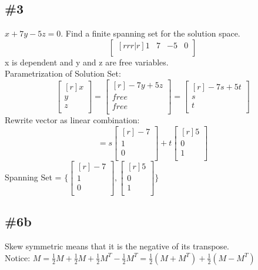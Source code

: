 \documentclass{report}
\theoremstyle{plain}
\theoremstyle{definition}
\theoremstyle{plain}
\begin{document}
\subsection{\#3}
$x+7y-5z=0$. Find a finite spanning set for the solution space.
\[ \begin{bmatrix}[rrr|r] 1&7&-5&0\\ \end{bmatrix} \]
x is dependent and y and z are free variables.\\
Parametrization of Solution Set:
\[ \begin{bmatrix}[r] x\\y\\z\\ \end{bmatrix} = \begin{bmatrix}[r] -7y+5z\\free\\free\\ \end{bmatrix} = \begin{bmatrix}[r] -7s+5t\\s\\t\\ \end{bmatrix} \]
Rewrite vector as linear combination:
\[ =s \begin{bmatrix}[r]-7\\1\\0\\ \end{bmatrix} +t \begin{bmatrix}[r] 5\\0\\1\\ \end{bmatrix} \]
Spanning Set = $\{\begin{bmatrix}[r]-7\\1\\0\\ \end{bmatrix} , \begin{bmatrix}[r]5\\0\\1\\ \end{bmatrix} \}$

\subsection{\#6b}
Skew symmetric means that it is the negative of its transpose.\\
Notice: $M=\frac{1}{2}M + \frac{1}{2}M + \frac{1}{2}M^T-\frac{1}{2}M^T = \frac{1}{2}(M+M^T)+\frac{1}{2}(M-M^T)$
\end{document}
